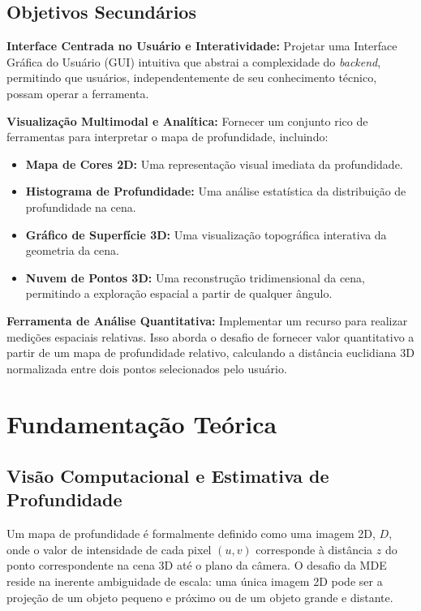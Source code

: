\documentclass{SBCbookchapter}
\begin{document}
    \subsection{Objetivos Secundários}
    \textbf{Interface Centrada no Usuário e Interatividade:} Projetar uma Interface
    Gráfica do Usuário (GUI) intuitiva que abstrai a complexidade do \textit{backend},
    permitindo que usuários, independentemente de seu conhecimento técnico, possam
    operar a ferramenta.

    \textbf{Visualização Multimodal e Analítica:} Fornecer um conjunto rico de
    ferramentas para interpretar o mapa de profundidade, incluindo:
    \begin{itemize}
        \item \textbf{Mapa de Cores 2D:} Uma representação visual imediata da profundidade.
        \item \textbf{Histograma de Profundidade:} Uma análise estatística da distribuição
        de profundidade na cena.
        \item \textbf{Gráfico de Superfície 3D:} Uma visualização topográfica interativa
        da geometria da cena.
        \item \textbf{Nuvem de Pontos 3D:} Uma reconstrução tridimensional da cena,
        permitindo a exploração espacial a partir de qualquer ângulo.
    \end{itemize}

    \textbf{Ferramenta de Análise Quantitativa:} Implementar um recurso para
    realizar medições espaciais relativas. Isso aborda o desafio de fornecer
    valor quantitativo a partir de um mapa de profundidade relativo, calculando
    a distância euclidiana 3D normalizada entre dois pontos selecionados pelo
    usuário.

    \section{Fundamentação Teórica}
    \subsection{Visão Computacional e Estimativa de Profundidade}
    Um mapa de profundidade é formalmente definido como uma imagem 2D, $D$, onde o valor de intensidade de cada pixel $(u, v)$ corresponde à distância $z$ do ponto correspondente na cena 3D até o plano da câmera. O desafio da MDE reside na inerente ambiguidade de escala: uma única imagem 2D pode ser a projeção de um objeto pequeno e próximo ou de um objeto grande e distante.
\end{document}
